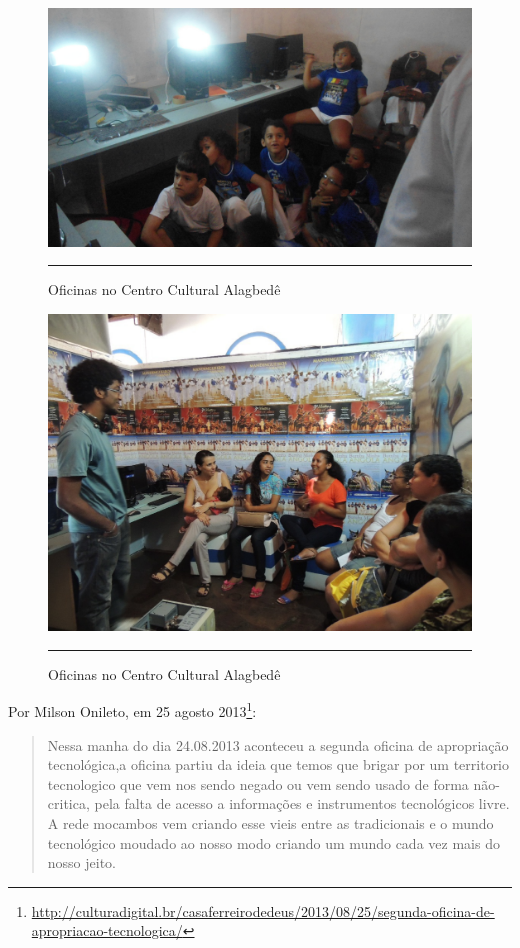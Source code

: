 \documentclass[a4paper, 11pt, oneside]{Relatorio_sem}  %
\begin{document}
\begin{figure}[htbp]
  \centering
  \includegraphics[width=\textwidth]{./Fig/Oficina_julho_MA_milson_1.pdf}
  \rule{35em}{0.5pt}
  \caption[Oficinas no Centro Cultural Alagbedê]{Oficinas no Centro Cultural Alagbedê}
  \label{fig:OficinaMA1}
\end{figure}
\begin{figure}[htbp]
  \centering
  \includegraphics[width=\textwidth]{./Fig/Oficina_julho_MA_milson_2.pdf}
  \rule{35em}{0.5pt}
  \caption[Oficinas no Centro Cultural Alagbedê]{Oficinas no Centro Cultural Alagbedê}
  \label{fig:OficinaMA2}
\end{figure}

Por Milson Onileto, em 25 agosto
2013\footnote{\url{http://culturadigital.br/casaferreirodedeus/2013/08/25/segunda-oficina-de-apropriacao-tecnologica/}}:
\begin{quote}
  Nessa manha do dia 24.08.2013 aconteceu a segunda oficina de
  apropriação tecnológica,a oficina partiu da ideia que temos que
  brigar por um territorio tecnologico que vem nos sendo negado ou vem
  sendo usado de forma não-critica, pela falta de acesso a informações
  e instrumentos tecnológicos livre. A rede mocambos vem criando esse
  vieis entre as tradicionais e o mundo tecnológico moudado ao nosso
  modo criando um mundo cada vez mais do nosso jeito.
\end{quote}
\end{document}
